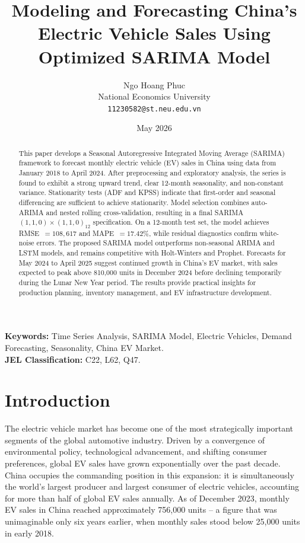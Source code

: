\documentclass[12pt]{article}
\title{\textbf{Modeling and Forecasting China's Electric Vehicle Sales Using Optimized SARIMA Model}}
\author{Ngo Hoang Phuc \\
National Economics University \\
\texttt{11230582@st.neu.edu.vn}}
\date{May 2026}
\begin{document}
\onehalfspacing
\maketitle

\begin{abstract}
\noindent
This paper develops a Seasonal Autoregressive Integrated Moving Average (SARIMA) framework to forecast monthly electric vehicle (EV) sales in China using data from January 2018 to April 2024. After preprocessing and exploratory analysis, the series is found to exhibit a strong upward trend, clear 12-month seasonality, and non-constant variance. Stationarity tests (ADF and KPSS) indicate that first-order and seasonal differencing are sufficient to achieve stationarity. Model selection combines auto-ARIMA and nested rolling cross-validation, resulting in a final SARIMA$(1,1,0)\times(1,1,0)_{12}$ specification. On a 12-month test set, the model achieves RMSE~$=108{,}617$ and MAPE~$=17.42\%$, while residual diagnostics confirm white-noise errors. The proposed SARIMA model outperforms non-seasonal ARIMA and LSTM models, and remains competitive with Holt-Winters and Prophet. Forecasts for May 2024 to April 2025 suggest continued growth in China's EV market, with sales expected to peak above 810,000 units in December 2024 before declining temporarily during the Lunar New Year period. The results provide practical insights for production planning, inventory management, and EV infrastructure development.
\end{abstract}

\vspace{0.3cm}
\noindent \textbf{Keywords:} Time Series Analysis, SARIMA Model, Electric Vehicles,
Demand Forecasting, Seasonality, China EV Market.\\
\noindent \textbf{JEL Classification:} C22, L62, Q47.

\newpage

\section{Introduction}
\label{sec:intro}

The electric vehicle market has become one of the most strategically important segments of the global automotive industry. Driven by a convergence of environmental policy, technological advancement, and shifting consumer preferences, global EV sales have grown exponentially over the past decade. China occupies the commanding position in this expansion: it is simultaneously the world's largest producer and largest consumer of electric vehicles, accounting for more than half of global EV sales annually. As of December 2023, monthly EV sales in China reached approximately 756,000 units -- a figure that was unimaginable only six years earlier, when monthly sales stood below 25,000 units in early 2018.
\end{document}
